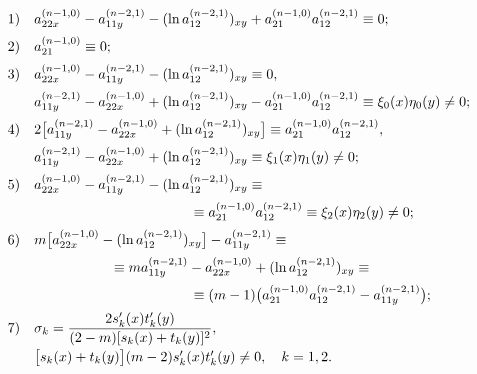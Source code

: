 \begin{equation}
\label{soz:eq15}
\begin{array}{ll}
1)& a_{22x}^{(n-1,0)}-a_{11y}^{(n-2,1)}-(\ln a_{12}^{(n-2,1)})_{xy}+a_{21}^{(n-1,0)}a_{12}^{(n-2,1)}\equiv0; 
\\[2mm]
2)&  a_{21}^{(n-1,0)}\equiv0; 
\\[2mm]
3)& a_{22x}^{(n-1,0)}-a_{11y}^{(n-2,1)}-(\ln a_{12}^{(n-2,1)})_{xy}\equiv0,
\\[2mm]
  & a_{11y}^{(n-2,1)}-a_{22x}^{(n-1,0)}+(\ln a_{12}^{(n-2,1)})_{xy}-a_{21}^{(n-1,0)}a_{12}^{(n-2,1)}\equiv \xi_{0}(x)\eta_{0}(y)\neq0; 
\\[2mm]  
4) & 2 \bigl[a_{11y}^{(n-2,1)}-a_{22x}^{(n-1,0)}+(\ln a_{12}^{(n-2,1)})_{xy}\bigr]\equiv a_{21}^{(n-1,0)}a_{12}^{(n-2,1)},
\\[2mm]
   & a_{11y}^{(n-2,1)}-a_{22x}^{(n-1,0)}+(\ln a_{12}^{(n-2,1)})_{xy}\equiv\xi_{1}(x)\eta_{1}(y)\neq0;
\\[2mm]   
5) & a_{22x}^{(n-1,0)}-a_{11y}^{(n-2,1)}-(\ln a_{12}^{(n-2,1)})_{xy}\equiv
\\[2mm] 
   & \hspace{4cm} \equiv a_{21}^{(n-1,0)}a_{12}^{(n-2,1)}\equiv\xi_{2}(x)\eta_{2}(y)\neq0;
\\[2mm]   
6) & m \bigl[a_{22x}^{(n-1,0)}-(\ln a_{12}^{(n-2,1)})_{xy}\bigr]-a_{11y}^{(n-2,1)}\equiv
\\[2mm]
   & \hspace{2cm} \equiv ma_{11y}^{(n-2,1)}-a_{22x}^{(n-1,0)}+(\ln a_{12}^{(n-2,1)})_{xy}\equiv
\\[2mm]   
   & \hspace{4cm} \equiv(m-1) \bigl(a_{21}^{(n-1,0)}a_{12}^{(n-2,1)}-a_{11y}^{(n-2,1)}\bigr);
\\[2mm]   
7) &  \sigma_{k}=\dfrac{2s' _{k}(x)t' _{k}(y)}{(2-m)[s_{k}(x)+t_{k}(y)]^{2}},\\[3mm]
   & \bigl[s_{k}(x)+t_{k}(y)\bigr](m-2)s' _{k}(x)t' _{k}(y)\neq0,\quad k=1, 2.
\end{array} \hspace{-1.2cm}
\end{equation}

\smallskip

